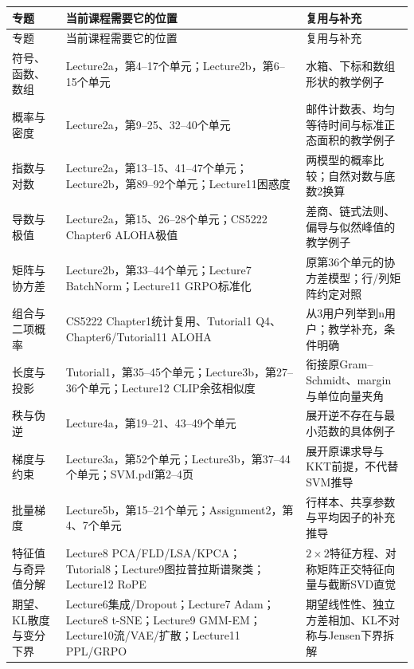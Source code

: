 \begingroup
\small\setlength{\tabcolsep}{3pt}
\renewcommand{\arraystretch}{1.22}
\begin{longtable}{@{}>{\raggedright\arraybackslash}p{}>{\raggedright\arraybackslash}p{}>{\raggedright\arraybackslash}p{}@{}}
\toprule
专题 & 当前课程需要它的位置 & 复用与补充 \\
\midrule\endfirsthead
专题 & 当前课程需要它的位置 & 复用与补充 \\
\midrule\endhead
\bottomrule\endfoot
符号、函数、数组 & Lecture2a，第4–17个单元；Lecture2b，第6–15个单元 & 水箱、下标和数组形状的教学例子 \\
概率与密度 & Lecture2a，第9–25、32–40个单元 & 邮件计数表、均匀等待时间与标准正态面积的教学例子 \\
指数与对数 & Lecture2a，第13–15、41–47个单元；Lecture2b，第89–92个单元；Lecture11困惑度 & 两模型的概率比较；自然对数与底数2换算 \\
导数与极值 & Lecture2a，第15、26–28个单元；CS5222 Chapter6 ALOHA极值 & 差商、链式法则、偏导与似然峰值的教学例子 \\
矩阵与协方差 & Lecture2b，第33–44个单元；Lecture7 BatchNorm；Lecture11 GRPO标准化 & 原第36个单元的协方差模型；行/列矩阵约定对照 \\
组合与二项概率 & CS5222 Chapter1统计复用、Tutorial1 Q4、Chapter6/Tutorial11 ALOHA & 从3用户列举到n用户；教学补充，条件明确 \\
长度与投影 & Tutorial1，第35–45个单元；Lecture3b，第27–36个单元；Lecture12 CLIP余弦相似度 & 衔接原Gram–Schmidt、margin与单位向量夹角 \\
秩与伪逆 & Lecture4a，第19–21、43–49个单元 & 展开逆不存在与最小范数的具体例子 \\
梯度与约束 & Lecture3a，第52个单元；Lecture3b，第37–44个单元；SVM.pdf第2–4页 & 展开原课求导与KKT前提，不代替SVM推导 \\
批量梯度 & Lecture5b，第15–21个单元；Assignment2，第4、7个单元 & 行样本、共享参数与平均因子的补充推导 \\
特征值与奇异值分解 & Lecture8 PCA/FLD/LSA/KPCA；Tutorial8；Lecture9图拉普拉斯谱聚类；Lecture12 RoPE & \(2\times2\)特征方程、对称矩阵正交特征向量与截断SVD直觉 \\
期望、KL散度与变分下界 & Lecture6集成/Dropout；Lecture7 Adam；Lecture8 t-SNE；Lecture9 GMM-EM；Lecture10流/VAE/扩散；Lecture11 PPL/GRPO & 期望线性性、独立方差相加、KL不对称与Jensen下界拆解 \\
\end{longtable}
\endgroup


